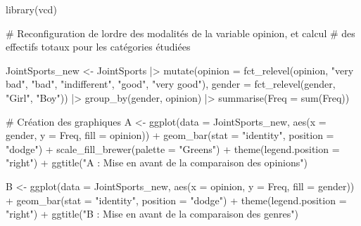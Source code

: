 \documentclass[
  letterpaper,
]{book}
\newenvironment{Shaded}{\begin{snugshade}}{\end{snugshade}}
\newcommand{\AttributeTok}[1]{\textcolor[rgb]{0.40,0.45,0.13}{#1}}
\newcommand{\CommentTok}[1]{\textcolor[rgb]{0.37,0.37,0.37}{#1}}
\newcommand{\FunctionTok}[1]{\textcolor[rgb]{0.28,0.35,0.67}{#1}}
\newcommand{\NormalTok}[1]{\textcolor[rgb]{0.00,0.23,0.31}{#1}}
\newcommand{\OtherTok}[1]{\textcolor[rgb]{0.00,0.23,0.31}{#1}}
\newcommand{\SpecialCharTok}[1]{\textcolor[rgb]{0.37,0.37,0.37}{#1}}
\newcommand{\StringTok}[1]{\textcolor[rgb]{0.13,0.47,0.30}{#1}}
\begin{document}
\begin{Shaded}
\begin{Highlighting}[]
\FunctionTok{library}\NormalTok{(vcd)}

\CommentTok{\# Reconfiguration de l\textquotesingle{}ordre des modalités de la variable opinion, et calcul }
\CommentTok{\# des effectifs totaux pour les catégories étudiées}

\NormalTok{JointSports\_new }\OtherTok{\textless{}{-}} 
\NormalTok{  JointSports }\SpecialCharTok{|\textgreater{}}
  \FunctionTok{mutate}\NormalTok{(}\AttributeTok{opinion =} \FunctionTok{fct\_relevel}\NormalTok{(opinion, }
                               \StringTok{"very bad"}\NormalTok{, }
                               \StringTok{"bad"}\NormalTok{, }
                               \StringTok{"indifferent"}\NormalTok{, }
                               \StringTok{"good"}\NormalTok{, }
                               \StringTok{"very good"}\NormalTok{),}
         \AttributeTok{gender =} \FunctionTok{fct\_relevel}\NormalTok{(gender, }\StringTok{"Girl"}\NormalTok{, }\StringTok{"Boy"}\NormalTok{)) }\SpecialCharTok{|\textgreater{}}
  \FunctionTok{group\_by}\NormalTok{(gender, opinion) }\SpecialCharTok{|\textgreater{}}
  \FunctionTok{summarise}\NormalTok{(}\AttributeTok{Freq =} \FunctionTok{sum}\NormalTok{(Freq))}

\CommentTok{\# Création des graphiques}
\NormalTok{A }\OtherTok{\textless{}{-}} 
  \FunctionTok{ggplot}\NormalTok{(}\AttributeTok{data =}\NormalTok{ JointSports\_new, }\FunctionTok{aes}\NormalTok{(}\AttributeTok{x =}\NormalTok{ gender, }\AttributeTok{y =}\NormalTok{ Freq, }\AttributeTok{fill =}\NormalTok{ opinion)) }\SpecialCharTok{+}
  \FunctionTok{geom\_bar}\NormalTok{(}\AttributeTok{stat =} \StringTok{"identity"}\NormalTok{,  }\AttributeTok{position =} \StringTok{"dodge"}\NormalTok{) }\SpecialCharTok{+}
  \FunctionTok{scale\_fill\_brewer}\NormalTok{(}\AttributeTok{palette =} \StringTok{"Greens"}\NormalTok{) }\SpecialCharTok{+}
  \FunctionTok{theme}\NormalTok{(}\AttributeTok{legend.position =} \StringTok{"right"}\NormalTok{) }\SpecialCharTok{+}
  \FunctionTok{ggtitle}\NormalTok{(}\StringTok{"A : Mise en avant de la comparaison des opinions"}\NormalTok{)}

\NormalTok{B }\OtherTok{\textless{}{-}} 
  \FunctionTok{ggplot}\NormalTok{(}\AttributeTok{data =}\NormalTok{ JointSports\_new, }\FunctionTok{aes}\NormalTok{(}\AttributeTok{x =}\NormalTok{ opinion, }\AttributeTok{y =}\NormalTok{ Freq, }\AttributeTok{fill =}\NormalTok{ gender)) }\SpecialCharTok{+}
  \FunctionTok{geom\_bar}\NormalTok{(}\AttributeTok{stat =} \StringTok{"identity"}\NormalTok{,  }\AttributeTok{position =} \StringTok{"dodge"}\NormalTok{) }\SpecialCharTok{+}
  \FunctionTok{theme}\NormalTok{(}\AttributeTok{legend.position =} \StringTok{"right"}\NormalTok{) }\SpecialCharTok{+}  
  \FunctionTok{ggtitle}\NormalTok{(}\StringTok{"B : Mise en avant de la comparaison des genres"}\NormalTok{)}
\end{Highlighting}
\end{Shaded}
\end{document}
